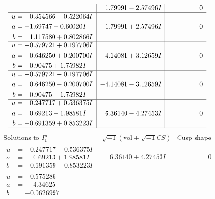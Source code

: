 \documentclass[1p]{elsarticle_modified}
\theoremstyle{definition}
\newcommand{\I}{\sqrt{-1}}
\begin{document}
$$\begin{array}{c|c|c}
 & \phantom{-}1.79991 - 2.57496 I & \phantom{-0.000000 } 0 \\ \hline\begin{aligned}
u &= \phantom{-}0.354566 - 0.522064 I \\
a &= -1.69747 - 0.60020 I \\
b &= \phantom{-}1.117580 + 0.802866 I\end{aligned}
 & \phantom{-}1.79991 + 2.57496 I & \phantom{-0.000000 } 0 \\ \hline\begin{aligned}
u &= -0.579721 + 0.197706 I \\
a &= \phantom{-}0.646250 + 0.200700 I \\
b &= -0.90475 + 1.75982 I\end{aligned}
 & -4.14081 + 3.12659 I & \phantom{-0.000000 } 0 \\ \hline\begin{aligned}
u &= -0.579721 - 0.197706 I \\
a &= \phantom{-}0.646250 - 0.200700 I \\
b &= -0.90475 - 1.75982 I\end{aligned}
 & -4.14081 - 3.12659 I & \phantom{-0.000000 } 0 \\ \hline\begin{aligned}
u &= -0.247717 + 0.536375 I \\
a &= \phantom{-}0.69213 - 1.98581 I \\
b &= -0.691359 + 0.853223 I\end{aligned}
 & \phantom{-}6.36140 - 4.27453 I & \phantom{-0.000000 } 0\\
 \hline 
 \end{array}$$\newpage$$\begin{array}{c|c|c}  
\text{Solutions to }I^u_{1}& \I (\text{vol} + \sqrt{-1}CS) & \text{Cusp shape}\\
 \hline 
\begin{aligned}
u &= -0.247717 - 0.536375 I \\
a &= \phantom{-}0.69213 + 1.98581 I \\
b &= -0.691359 - 0.853223 I\end{aligned}
 & \phantom{-}6.36140 + 4.27453 I & \phantom{-0.000000 } 0 \\ \hline\begin{aligned}
u &= -0.575286\phantom{ +0.000000I} \\
a &= \phantom{-}4.34625\phantom{ +0.000000I} \\
b &= -0.0626997\phantom{ +0.000000I}\end{aligned}

\end{array}$$
\end{document}
